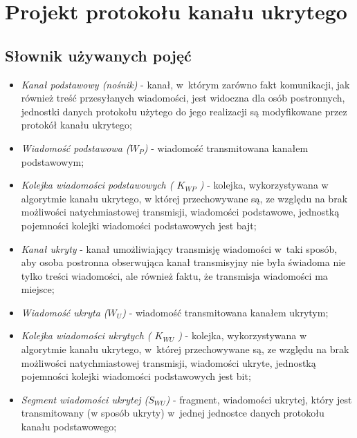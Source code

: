 \documentclass[a4paper, twoside, openright, 12pt]{report}
\begin{document}
\chapter{Projekt protokołu kanału ukrytego}
    \section{Słownik używanych pojęć} \label{DICT}
    \begin{itemize}
        \item \emph{Kanał podstawowy (nośnik)} - kanał, w~którym zarówno fakt komunikacji,
            jak również treść przesyłanych wiadomości, jest widoczna dla osób postronnych,
            jednostki danych protokołu użytego do jego realizacji są modyfikowane przez
            protokół kanału ukrytego;

        \item \emph{Wiadomość podstawowa (\(W_P\))} - wiadomość transmitowana kanałem
            podstawowym;

        \item \emph{Kolejka wiadomości podstawowych ( \( K_{WP} \) )} - kolejka,
                wykorzystywana w algorytmie kanału ukrytego, w
                której przechowywane są, ze względu na brak możliwości natychmiastowej
                transmisji, wiadomości podstawowe, jednostką pojemności kolejki
                wiadomości podstawowych jest bajt;

        \item \emph{Kanał ukryty} - kanał umożliwiający transmisję wiadomości w~taki sposób,
            aby osoba postronna obserwująca kanał transmisyjny nie była świadoma
            nie tylko treści wiadomości, ale również faktu, że transmisja wiadomości ma miejsce;

        \item \emph{Wiadomość ukryta (\(W_U\))} - wiadomość transmitowana kanałem ukrytym;

        \item \emph{Kolejka wiadomości ukrytych ( \( K_{WU} \) )} - kolejka,
                wykorzystywana w algorytmie kanału ukrytego, w~której
                przechowywane są, ze względu na brak możliwości natychmiastowej
                transmisji, wiadomości ukryte, jednostką pojemności kolejki
                wiadomości podstawowych jest bit;

        \item \emph{Segment wiadomości ukrytej (\(S_{WU}\))} - fragment,
            wiadomości ukrytej, który jest transmitowany (w sposób ukryty) w~jednej
            jednostce danych protokołu kanału podstawowego;


\end{itemize}
\end{document}
